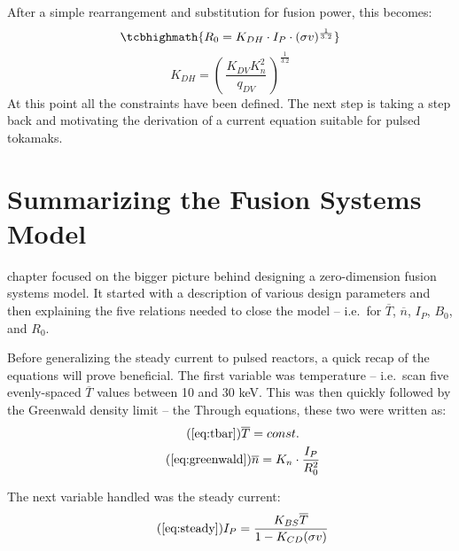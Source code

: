  After a simple rearrangement and substitution for fusion power, this becomes:
\begin{equation}
	\label{eq:r_heat}
	\tcbhighmath{ R_0 = K_{DH} \cdot I_P \cdot (\sigma v)^ {\frac{1}{3.2}} }
\end{equation} 
\begin{equation}
	K_{DH} = \left( \, \frac{ K_{DV} K_n^2 }{ q_{DV} } \, \right) ^ {\frac{1}{3.2}}
\end{equation} 
At this point all the  constraints have been defined. The next step is taking a step back and motivating the derivation of a current equation suitable for pulsed tokamaks.

\section{Summarizing the Fusion Systems Model}

 chapter focused on the bigger picture behind designing a zero-dimension fusion systems model. It started with a description of various design parameters and then  explaining the five relations needed to close the model -- i.e.\ for $\overline T$, $\overline n$, $I_P$, $B_0$, and $R_0$.

Before  generalizing the steady current to  pulsed reactors,  a quick recap of the equations will prove beneficial. The first variable  was temperature -- i.e.\ scan five evenly-spaced $\overline T$ values between 10 and 30 keV. This was then quickly followed by the Greenwald density limit -- the  Through equations, these two were written as:
\begin{gather}
	\tag{\ref{eq:tbar}}
	\overline T = const. \\
	\tag{\ref{eq:greenwald}}
	\overline n = K_n \cdot \frac{I_P}{R_0^2}
\end{gather}

The next variable handled was the steady current:
\begin{equation}
	\tag{\ref{eq:steady}}
	I_P = \frac{K_{BS} \overline T}{1 - K_{CD} ( \sigma v ) }
\end{equation} 

